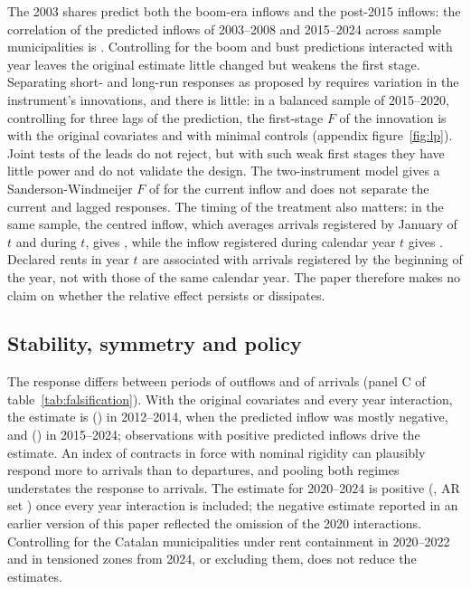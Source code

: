 \documentclass[11pt,a4paper]{article}
\begin{document}
The 2003 shares predict both the boom-era inflows and the post-2015 inflows: the correlation of the predicted inflows of 2003--2008 and 2015--2024 across sample municipalities is \boomCorr. Controlling for the boom and bust predictions interacted with year leaves the original estimate little changed but weakens the first stage. Separating short- and long-run responses as proposed by \citet{jaeger2018} requires variation in the instrument's innovations, and there is little: in a balanced sample of 2015--2020, controlling for three lags of the prediction, the first-stage $F$ of the innovation is \lpFcov{} with the original covariates and \lpFmin{} with minimal controls (appendix figure~\ref{fig:lp}). Joint tests of the leads do not reject, but with such weak first stages they have little power and do not validate the design. The two-instrument model gives a Sanderson-Windmeijer $F$ of \swFOne{} for the current inflow and does not separate the current and lagged responses. The timing of the treatment also matters: in the same sample, the centred inflow, which averages arrivals registered by January of $t$ and during $t$, gives \cenB, while the inflow registered during calendar year $t$ gives \calB. Declared rents in year $t$ are associated with arrivals registered by the beginning of the year, not with those of the same calendar year. The paper therefore makes no claim on whether the relative effect persists or dissipates.

\subsection{Stability, symmetry and policy}

The response differs between periods of outflows and of arrivals (panel C of table~\ref{tab:falsification}). With the original covariates and every year interaction, the estimate is \wOut{} (\wOutSe) in 2012--2014, when the predicted inflow was mostly negative, and \wIn{} (\wInAR) in 2015--2024; observations with positive predicted inflows drive the estimate. An index of contracts in force with nominal rigidity can plausibly respond more to arrivals than to departures, and pooling both regimes understates the response to arrivals. The estimate for 2020--2024 is positive (\wTwoZeroTwoFour, AR set \wTwoZeroTwoFourAR) once every year interaction is included; the negative estimate reported in an earlier version of this paper reflected the omission of the 2020 interactions. Controlling for the Catalan municipalities under rent containment in 2020--2022 and in tensioned zones from 2024, or excluding them, does not reduce the estimates.
\end{document}
